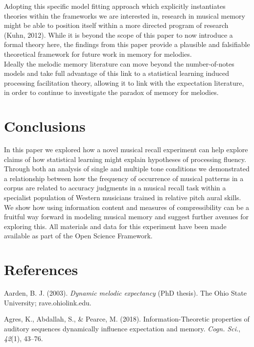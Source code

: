 \documentclass[english,man]{apa6}
\begin{document}
Adopting this specific model fitting approach which explicitly instantiates theories within the frameworks we are interested in, research in musical memory might be able to position itself within a more directed program of research (Kuhn, 2012).
While it is beyond the scope of this paper to now introduce a formal theory here, the findings from this paper provide a plausible and falsifiable theoretical framework for future work in memory for melodies.\\
Ideally the melodic memory literature can move beyond the number-of-notes models and take full advantage of this link to a statistical learning induced processing facilitation theory, allowing it to link with the expectation literature, in order to continue to investigate the paradox of memory for melodies.

\hypertarget{conclusions}{%
\section{Conclusions}\label{conclusions}}

In this paper we explored how a novel musical recall experiment can help explore claims of how statistical learning might explain hypotheses of processing fluency.
Through both an analysis of single and multiple tone conditions we demonstrated a relationship between how the frequency of occurrence of musical patterns in a corpus are related to accuracy judgments in a musical recall task within a specialist population of Western musicians trained in relative pitch aural skills.
We show how using information content and measures of compressibility can be a fruitful way forward in modeling musical memory and suggest further avenues for exploring this.
All materials and data for this experiment have been made available as part of the Open Science Framework.

\newpage

\hypertarget{references}{%
\section{References}\label{references}}

\begingroup
\setlength{\parindent}{-0.5in}
\setlength{\leftskip}{0.5in}

\hypertarget{refs}{}
\leavevmode\hypertarget{ref-Aarden2003-ib}{}%
Aarden, B. J. (2003). \emph{Dynamic melodic expectancy} (PhD thesis). The Ohio State University; rave.ohiolink.edu.

\leavevmode\hypertarget{ref-Agres2018-dw}{}%
Agres, K., Abdallah, S., \& Pearce, M. (2018). Information-Theoretic properties of auditory sequences dynamically influence expectation and memory. \emph{Cogn. Sci.}, \emph{42}(1), 43--76.
\end{document}
